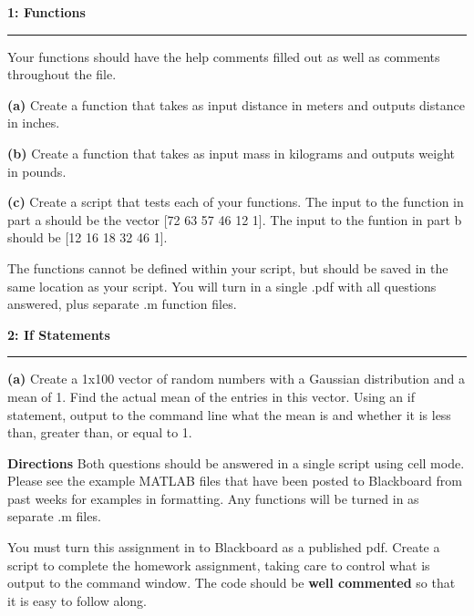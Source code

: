 \documentclass[11pt]{article}
\newcommand\question[2]{\vspace{.25in}\textbf{#1: #2}\vspace{.5em}\hrule\vspace{.10in}}
\renewcommand\part[1]{\vspace{.10in}\textbf{(#1)}}
\begin{document}
\raggedright

\question{1}{Functions} 
Your functions should have the help comments filled out as well as comments throughout the file.

\part{a} Create a function that takes as input distance in meters and outputs distance in inches.

\part{b} Create a function that takes as input mass in kilograms and outputs weight in pounds.

\part{c} Create a script that tests each of your functions. 
The input to the function in part a should be the vector [72 63 57 46 12 1]. 
The input to the funtion in part b should be [12 16 18 32 46 1].

The functions cannot be defined within your script, but should be saved in the same location as your script. You will turn in a single .pdf with all questions answered, plus separate .m function files. 

\question{2}{If Statements}
\part{a} Create a 1x100 vector of random numbers with a Gaussian distribution and a mean of 1.
Find the actual mean of the entries in this vector. 
Using an if statement, output to the command line what the mean is and whether it is less than, greater than, or equal to 1.

\vspace{1.0em}
\textbf{Directions}
Both questions should be answered in a single script using cell mode. Please see the example MATLAB files that have been posted to Blackboard from past weeks for examples in formatting. Any functions will be turned in as separate .m files.

You must turn this assignment in to Blackboard as a published pdf. Create a script to complete the homework assignment, taking care to control what is output to the command window. The code should be \textbf{well commented} so that it is easy to follow along. 
\end{document}
